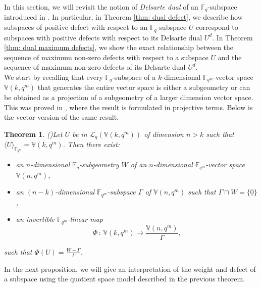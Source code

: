 \documentclass[11pt]{amsart}
\newtheorem{theorem}{Theorem}[section]
\newcommand{\fqm}{\mathbb{F}_{q^m}}
\newcommand{\fq}{{\mathbb F}_{q}}
\begin{document}
In this section, we will revisit the notion of {\it Delsarte dual} of an $\fq$-subspace introduced in \cite{csajbok2021generalising}. In particular, in Theorem \ref{thm: dual defect}, we describe how subspaces of positive defect with respect to an $\fq$-subspace $U$ correspond to subspaces with positive defects with respect to its Delsarte dual $U^d$. In Theorem \ref{thm: dual maximum defects}, we show the exact relationship between the sequence of maximum non-zero defects with respect to a subspace $U$ and the sequence of maximum non-zero defects of its Delsarte dual $U^d$.\\

We start by recalling that every $\fq$-subspace of a $k$-dimensional $\fqm$-vector space $\mathbb{V}(k,q^m)$ that generates the entire vector space is either a subgeometry or can be obtained as a projection of a subgeometry of a larger dimension vector space. This was proved in \cite{lunardon2004translation}, where the result  is formulated in projective terms. Below is the vector-version of the same result.

  \begin{theorem}(\cite[Theorem 2]{lunardon2004translation})\label{thm:projection_subg}
    Let $U$ be in $\mathcal{L}_q(\mathbb{V}(k,q^m))$ of dimension $n>k$ such that $\langle U \rangle_{\fqm}=\mathbb{V}(k,q^m)$. Then there exist:
    \begin{itemize}
        \item[1.]  an $n$-dimensional $\fq$-subgeometry $W$ of an $n$-dimensional $\fqm$-vector space $\mathbb{V}(n,q^m)$,
        \item[2.] an $(n-k)$-dimensional $\fqm$-subspace $\Gamma$ of $\mathbb{V}(n,q^m)$ such that $\Gamma \cap W=\{ \underline 0\}$,
        \item[3.] an invertible $\fqm$-linear map 
    \[\Phi \,:\, \mathbb{V}(k,q^m) \longrightarrow \frac{\mathbb{V}(n,q^m)}{\Gamma},\]
     \end{itemize}
    
    such that $\Phi (U)=\frac{W+\Gamma}{\Gamma}$.
\end{theorem}

In the next proposition, we will give an interpretation of the weight and defect of a subspace using the quotient space model described in the previous theorem.
\end{document}
